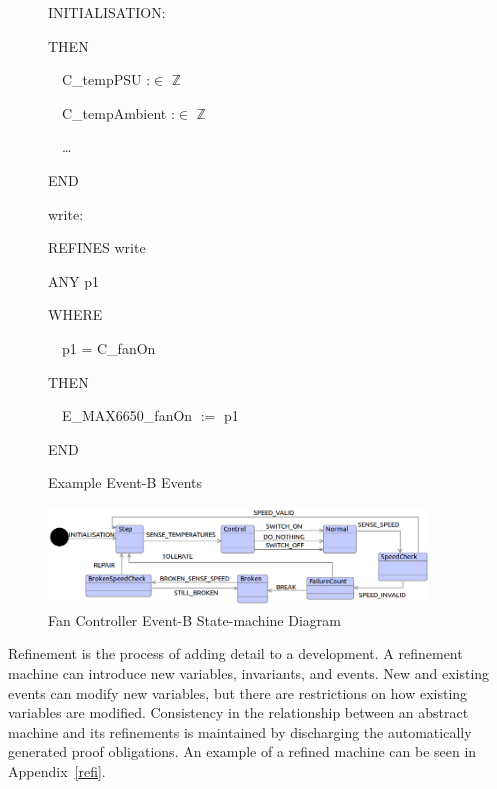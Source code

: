 \documentclass{llncs}%
\begin{document}
\begin{figure}[t]
\centering
\begin{minipage}{0.45\linewidth}
INITIALISATION:\ \ 

THEN

\ \ C\_tempPSU :${\in}$ $\mathbb{Z}$ 

\ \ C\_tempAmbient :${\in}$ $\mathbb{Z}$ 

\ \ \ldots

END

\bigskip

\end{minipage}
%
\begin{minipage}{0.45\linewidth}
write: 

REFINES write 

ANY p1\ \  \ 

WHERE

\ \ p1 = C\_fanOn \ \ 

THEN

\ \ E\_MAX6650\_fanOn $:=$ p1 

END
\end{minipage}
\caption{Example Event-B Events}
\label{fig:TextualEventB2}
\end{figure}
%
%
%
\begin{figure}[b]
\centering
\includegraphics[width=0.9\textwidth]{sm1.png}
\caption{Fan Controller Event-B State-machine Diagram}\label{fig:sm1}
\end{figure}
%

Refinement is the process of adding detail to a development. A refinement machine can introduce new variables, invariants, and events. New and existing events can modify new variables, but there are restrictions on how existing variables are modified. Consistency in the relationship between an abstract machine and its refinements is maintained by discharging the automatically generated proof obligations. An example of a refined machine can be seen in Appendix~\ref{refi}.    
\end{document}
